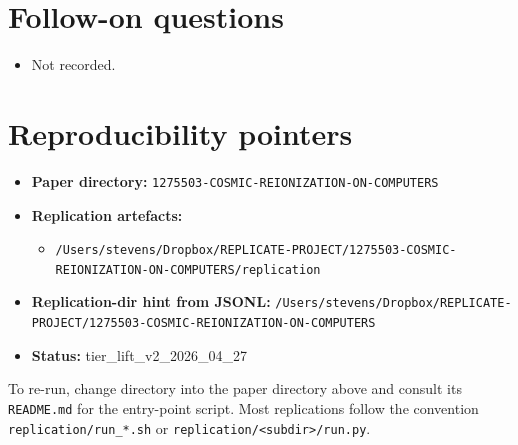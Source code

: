\documentclass[11pt]{article}
\begin{document}
\section{Follow-on questions}
\begin{itemize}
\item Not recorded.
\end{itemize}

\section{Reproducibility pointers}\label{sec:repro}
\begin{itemize}
\item \textbf{Paper directory:} \texttt{1275503-COSMIC-REIONIZATION-ON-COMPUTERS}
\item \textbf{Replication artefacts:}
\begin{itemize}
\item \texttt{/Users/stevens/Dropbox/REPLICATE-PROJECT/1275503-COSMIC-REIONIZATION-ON-COMPUTERS/replication}
\end{itemize}
\item \textbf{Replication-dir hint from JSONL:} \texttt{/Users/stevens/Dropbox/REPLICATE-PROJECT/1275503-COSMIC-REIONIZATION-ON-COMPUTERS}
\item \textbf{Status:} tier\_lift\_v2\_2026\_04\_27
\end{itemize}

To re-run, change directory into the paper directory above and consult its \texttt{README.md} for the entry-point script. Most replications follow the convention \texttt{replication/run\_*.sh} or \texttt{replication/<subdir>/run.py}.
\end{document}

